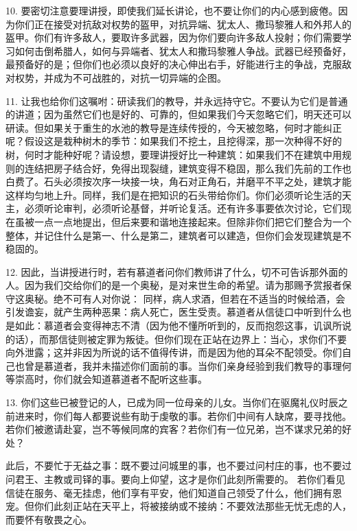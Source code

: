 10. 要密切注意要理讲授，即使我们延长讲论，也不要让你们的内心感到疲倦。因为你们正在接受对抗敌对权势的盔甲，对抗异端、犹太人、撒玛黎雅人和外邦人的盔甲。你们有许多敌人，要取许多武器，因为你们要向许多敌人投射；你们需要学习如何击倒希腊人，如何与异端者、犹太人和撒玛黎雅人争战。武器已经预备好，最预备好的是；但你们也必须以良好的决心伸出右手，好能进行主的争战，克服敌对权势，并成为不可战胜的，对抗一切异端的企图。\par

11. 让我也给你们这嘱咐：研读我们的教导，并永远持守它。不要认为它们是普通的讲道；因为虽然它们也是好的、可靠的，但如果我们今天忽略它们，明天还可以研读。但如果关于重生的水池的教导是连续传授的，今天被忽略，何时才能纠正呢？假设这是栽种树木的季节：如果我们不挖土，且挖得深，那一次种得不好的树，何时才能种好呢？请设想，要理讲授好比一种建筑：如果我们不在建筑中用规则的连结把房子结合好，免得出现裂缝，建筑变得不稳固，那么我们先前的工作也白费了。石头必须按次序一块接一块，角石对正角石，并磨平不平之处，建筑才能这样均匀地上升。同样，我们是在把知识的石头带给你们。你们必须听论生活的天主，必须听论审判，必须听论基督，并听论复活。还有许多事要依次讨论，它们现在虽被一点一点地提出，但后来要和谐地连接起来。但除非你们把它们整合为一个整体，并记住什么是第一、什么是第二，建筑者可以建造，但你们会发现建筑是不稳固的。\par

12. 因此，当讲授进行时，若有慕道者问你们教师讲了什么，切不可告诉那外面的人。因为我们交给你们的是一个奥秘，是对来世生命的希望。请为那赐予赏报者保守这奥秘。绝不可有人对你说： 同样，病人求酒，但若在不适当的时候给酒，会引发谵妄，就产生两种恶果：病人死亡，医生受责。慕道者从信徒口中听到什么也是如此：慕道者会变得神志不清（因为他不懂所听到的，反而抱怨这事，讥讽所说的话），而那信徒则被定罪为叛徒。但你们现在正站在边界上：当心，求你们不要向外泄露；这并非因为所说的话不值得传讲，而是因为他的耳朵不配领受。你们自己也曾是慕道者，我并未描述你们面前的事。当你们亲身经验到我们教导的事理何等崇高时，你们就会知道慕道者不配听这些事。\par

13. 你们这些已被登记的人，已成为同一位母亲的儿女。当你们在驱魔礼仪时辰之前进来时，你们每人都要说些有助于虔敬的事。若你们中间有人缺席，要寻找他。若你们被邀请赴宴，岂不等候同席的宾客？若你们有一位兄弟，岂不谋求兄弟的好处？\par

此后，不要忙于无益之事：既不要过问城里的事，也不要过问村庄的事，也不要过问君王、主教或司铎的事。要向上仰望，这才是你们此刻所需要的。 若你们看见信徒在服务、毫无挂虑，他们享有平安，他们知道自己领受了什么，他们拥有恩宠。但你们此刻正站在天平上，将被接纳或不接纳：不要效法那些无忧无虑的人，而要怀有敬畏之心。\par

